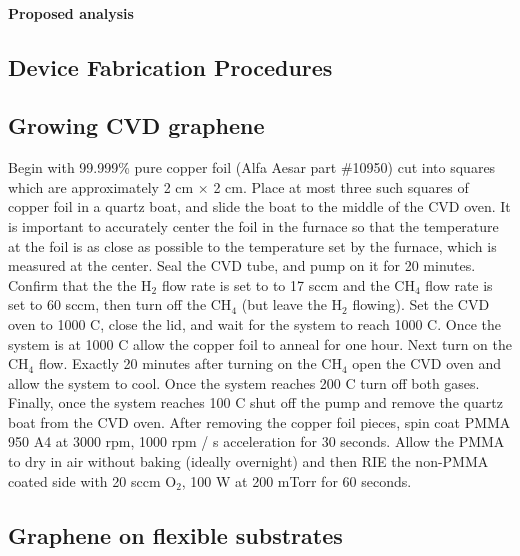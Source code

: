 \documentclass[edeposit,fullpage,draftthesis]{uiucthesis2009}
\begin{document}
            \subsubsection*{Proposed analysis}

\begin{appendices}

\chapter{Device Fabrication Procedures}
\label{appendix:fab}

\section{Growing CVD graphene}

    Begin with 99.999\% pure copper foil (Alfa Aesar part \#10950) cut into squares which are
    approximately 2 cm $\times$ 2 cm. Place at most three such squares of copper foil
    in a quartz boat, and slide the boat to the middle of the CVD oven. It is important
    to accurately center the foil in the furnace so that the temperature at the foil is as
    close as possible to the temperature set by the furnace, which is measured at the center.
    Seal the CVD tube, and pump on it for 20 minutes. Confirm that the the H$_2$ flow rate 
    is set to to 17 sccm and the CH$_4$ flow rate is set to 60 sccm, then turn off the CH$_4$
    (but leave the H$_2$ flowing). Set the CVD oven to 1000 C, close the lid, and wait for the
    system to reach 1000 C. Once the system is at 1000 C allow the copper foil to anneal for
    one hour. Next turn on the CH$_4$ flow. Exactly 20 minutes after turning on the CH$_4$
    open the CVD oven and allow the system to cool. Once the system reaches 200 C turn off
    both gases. Finally, once the system reaches 100 C shut off the pump and remove the 
    quartz boat from the CVD oven. After removing the copper foil pieces, spin coat PMMA 950 A4
    at 3000 rpm, 1000 rpm / s acceleration for 30 seconds. Allow the PMMA to dry in air without
    baking (ideally overnight) and then RIE the non-PMMA coated side with 20 sccm O$_2$, 100 W 
    at 200 mTorr for 60 seconds.
    
\section{Graphene on flexible substrates}


\end{appendices}
\end{document}

